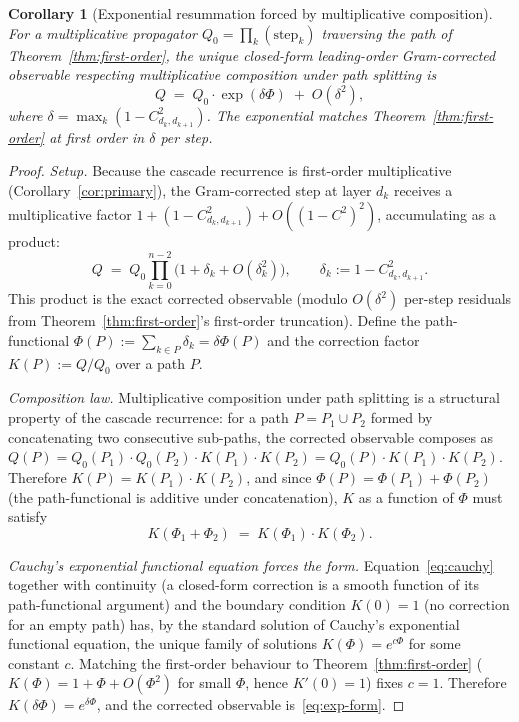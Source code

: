 \documentclass[11pt,a4paper]{article}
\newtheorem{corollary}[theorem]{Corollary}
\begin{document}
\begin{corollary}[Exponential resummation forced by multiplicative composition]\label{cor:exp-resum}
For a multiplicative propagator $Q_0 = \prod_k (\text{step}_k)$
traversing the path of Theorem~\ref{thm:first-order}, the unique
closed-form leading-order Gram-corrected observable respecting
multiplicative composition under path splitting is
\begin{equation}\label{eq:exp-form}
Q \;=\; Q_0\cdot\exp(\delta\Phi) \;+\; O(\delta^2),
\end{equation}
where $\delta = \max_k (1 - C_{d_k,d_{k+1}}^2)$. The exponential
matches Theorem~\ref{thm:first-order} at first order in $\delta$ per
step.
\end{corollary}

\begin{proof}
\emph{Setup.} Because the cascade recurrence is first-order
multiplicative (Corollary~\ref{cor:primary}), the Gram-corrected step at
layer $d_k$ receives a multiplicative factor
$1 + (1 - C_{d_k,d_{k+1}}^2) + O((1-C^2)^2)$, accumulating as a product:
\[
Q \;=\; Q_0\prod_{k=0}^{n-2}\bigl(1 + \delta_k + O(\delta_k^2)\bigr),
\qquad \delta_k := 1 - C_{d_k,d_{k+1}}^2.
\]
This product is the exact corrected observable (modulo $O(\delta^2)$
per-step residuals from Theorem~\ref{thm:first-order}'s first-order
truncation). Define the path-functional
$\Phi(P) := \sum_{k\in P} \delta_k = \delta\Phi(P)$ and the correction factor
$K(P) := Q/Q_0$ over a path $P$.

\emph{Composition law.} Multiplicative composition under path
splitting is a structural property of the cascade recurrence: for a
path $P = P_1 \cup P_2$ formed by concatenating two consecutive
sub-paths, the corrected observable composes as
$Q(P) = Q_0(P_1)\cdot Q_0(P_2) \cdot K(P_1) \cdot K(P_2) = Q_0(P)\cdot K(P_1)\cdot K(P_2)$.
Therefore $K(P) = K(P_1)\cdot K(P_2)$, and since $\Phi(P) = \Phi(P_1) + \Phi(P_2)$
(the path-functional is additive under concatenation), $K$ as a
function of $\Phi$ must satisfy
\begin{equation}\label{eq:cauchy}
K(\Phi_1 + \Phi_2) \;=\; K(\Phi_1) \cdot K(\Phi_2).
\end{equation}

\emph{Cauchy's exponential functional equation forces the form.}
Equation~\eqref{eq:cauchy} together with continuity (a closed-form
correction is a smooth function of its path-functional argument) and
the boundary condition $K(0) = 1$ (no correction for an empty path)
has, by the standard solution of Cauchy's exponential functional
equation, the unique family of solutions $K(\Phi) = e^{c\Phi}$ for
some constant $c$. Matching the first-order behaviour to
Theorem~\ref{thm:first-order} ($K(\Phi) = 1 + \Phi + O(\Phi^2)$ for
small $\Phi$, hence $K'(0) = 1$) fixes $c = 1$. Therefore
$K(\delta\Phi) = e^{\delta\Phi}$, and the corrected observable is~\eqref{eq:exp-form}.


\end{proof}
\end{document}
